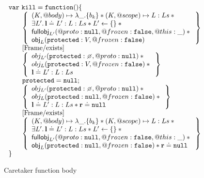 \documentclass[a4paper,notitlepage]{report}
\begin{document}
\begin{figure}
  \[
    \begin{array}{l}
      \jsvar{kill = function() \{} \\
      \indblock{
        \logic{
          (K, @body) \mapsto \lambda \_.\{b_k\} \sep (K, @scope) \mapsto L:Ls \sep {} \\
          \exists L' \st \ls \doteq L' : L : Ls \sep L' \bp \{\} \sep {} \\
          \fullobj_{L'}(@proto:\nil, @frozen:\false, @this:\_) \sep {} \\
          \obj_L(\js{protected}: V, @frozen: \false)
        } \\
        \step{Frame/exists} \\
        \logic{
          obj_{L'}(\js{protected}: \none, @proto: \nil) \sep {} \\
          obj_L(\js{protected}: V, @frozen: \false) \sep {} \\
          \ls \doteq L':L:Ls
        } \\
        \js{protected = null;} \\
        \logic{
          obj_{L'}(\js{protected}: \none, @proto: \nil) \sep {} \\
          obj_L(\js{protected}: \nil, @frozen: \false) \sep {} \\
          \ls \doteq L':L:Ls \sep \rv \doteq \nil
        } \\
        \step{Frame/exists} \\
        \logic{
          (K, @body) \mapsto \lambda \_.\{b_k\} \sep (K, @scope) \mapsto L:Ls \sep {} \\
          \exists L' \st \ls \doteq L' : L : Ls \sep L' \bp \{\} \sep {} \\
          \fullobj_{L'}(@proto:\nil, @frozen:\false, @this:\_) \sep {} \\
          \obj_L(\js{protected}: \nil, @frozen: \false) \sep \rv \doteq \nil
        }
      }
      \js{\}}
    \end{array}
  \]
  \caption{Caretaker  function body}
  \label{rr-kill}
\end{figure}
\end{document}
